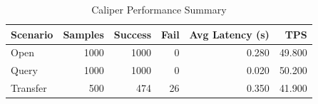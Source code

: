 \begin{table}
\caption{Caliper Performance Summary}
\label{tab:caliper_round}
\begin{tabular}{lrrrrr}
\toprule
Scenario & Samples & Success & Fail & Avg Latency (s) & TPS \\
\midrule
Open & 1000 & 1000 & 0 & 0.280 & 49.800 \\
Query & 1000 & 1000 & 0 & 0.020 & 50.200 \\
Transfer & 500 & 474 & 26 & 0.350 & 41.900 \\
\bottomrule
\end{tabular}
\end{table}
